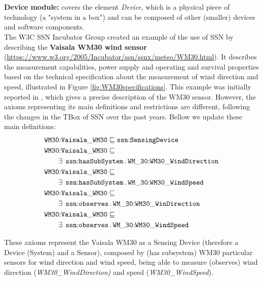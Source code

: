 \documentclass{sig-alternate-05-2015}
\newcommand{\erestr}[2]{\exists\;\,{\tt #1}\,.\,{\tt #2}}
\begin{document}
\\\\\textbf{Device module:} covers the element \textit{Device}, which is a physical piece of technology (a "system in a box") and can be composed of other (smaller) devices and software components.\\
 
The W3C SSN Incubator Group created an example of the use of SSN by describing the \textbf{Vaisala WM30 wind sensor} (\url{https://www.w3.org/2005/Incubator/ssn/ssnx/meteo/WM30.html}). It describes the measurement capabilities, power supply and operating and survival properties based on the technical specification about the measurement of wind direction and speed, illustrated in Figure \ref{fig:WM30specifications}. This example was initially reported in \cite{Compton2009}, which gives a precise description of the WM30 sensor. However, the axioms representing its main definitions and restrictions are different, following the changes in the TBox of SSN over the past years. Bellow we update these main definitions:
\begin{align*}
  \begin{aligned}
	&\node{WM30}{Vaisala\-\_WM30} \sqsubseteq \node{ssn}{SensingDevice}\\
	&\node{WM30}{Vaisala\-\_WM30} \sqsubseteq\\
	&\qquad\erestr{\node{ssn}{hasSubSystem}}{\node{WM\_30}{WM30\-\_Wind\-Direction}}\\
	&\node{WM30}{Vaisala\-\_WM30} \sqsubseteq\\
	&\qquad\erestr{\node{ssn}{hasSubSystem}}{\node{WM\_30}{WM30\-\_WindSpeed}}\\	
	&\node{WM30}{Vaisala\-\_WM30} \sqsubseteq\\
	&\qquad\erestr{\node{ssn}{observes}}{\node{WM\_30}{WM30\-\_WinDirection}}\\
	&\node{WM30}{Vaisala\-\_WM30} \sqsubseteq\\
	&\qquad\erestr{\node{ssn}{observes}}{\node{WM\_30}{WM30\-\_WindSpeed}}\\
  \end{aligned}\\
\end{align*}

These axioms represent the Vaisala WM30 as a Sensing Device (therefore a Device (System) and a Sensor), composed by (has subsystem) WM30 particular sensors for wind direction and wind speed, being able to measure (observes) wind direction (\textit{WM30\-\_Wind\-Direction)} and speed (\textit{WM30\-\_WindSpeed}). 
\end{document}
